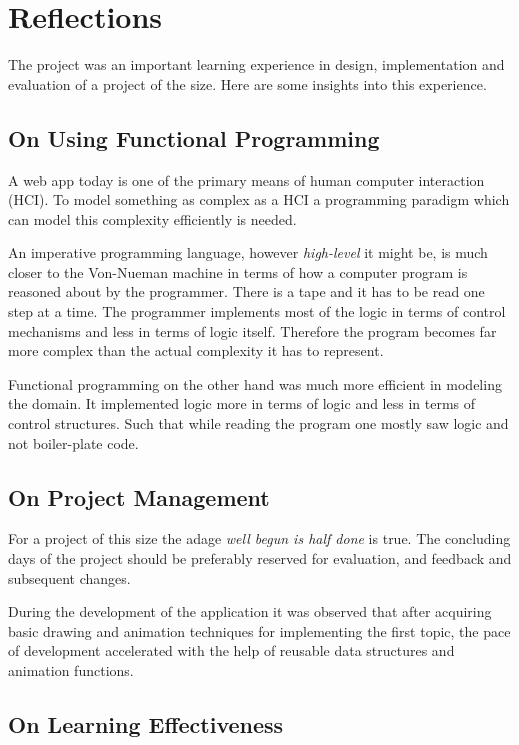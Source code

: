 \section{Reflections}

The project was an important learning experience in design, implementation and
evaluation of a project of the size. Here are some insights into this experience.

\subsection{On Using Functional Programming} 
\label{reflection: functional}

A web app today is one of the primary means of human computer interaction
(HCI). To model something as complex as a HCI a programming paradigm which can
model this complexity efficiently is needed. 

An imperative programming language, however \emph{high-level} it might be, is
much closer to the Von-Nueman machine in terms of how a computer program is
reasoned about by the programmer. There is a tape and it has to be read one
step at a time. The programmer implements most of the logic in terms of control
mechanisms and less in terms of logic itself. Therefore the program becomes far
more complex than the actual complexity it has to represent. 

Functional programming on the other hand was much more efficient in modeling
the domain. It implemented logic more in terms of logic and less in terms of
control structures. Such that while reading the program one mostly saw logic
and not boiler-plate code.

\subsection{On Project Management}
For a project of this size the adage \emph{well begun is half done} is true.
The concluding days of the project should be preferably reserved for
evaluation, and feedback and subsequent changes.

During the development of the application it was observed that after acquiring
basic drawing and animation techniques for implementing the first topic, the
pace of development accelerated with the help of reusable data structures and
animation functions.

\subsection{On Learning Effectiveness}

